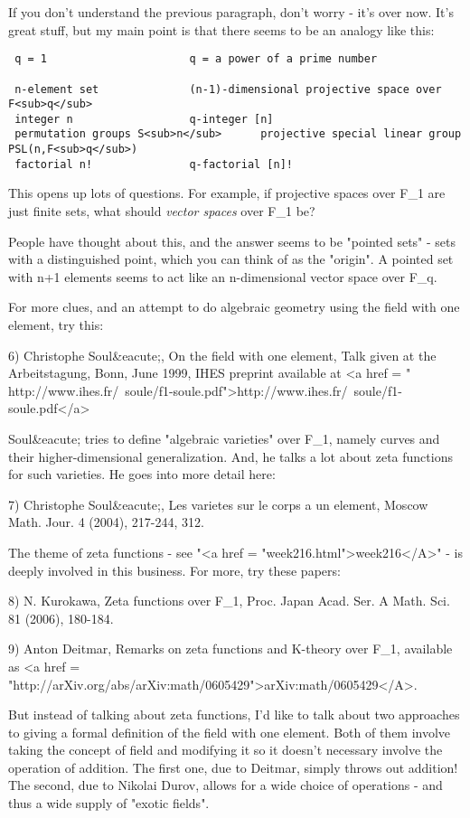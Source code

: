 If you don't understand the previous paragraph, don't worry - it's
over now.  It's great stuff, but my main point is that there seems to 
be an analogy like this:

\begin{verbatim}
 q = 1                      q = a power of a prime number    

 n-element set              (n-1)-dimensional projective space over F<sub>q</sub>
 integer n                  q-integer [n]
 permutation groups S<sub>n</sub>      projective special linear group PSL(n,F<sub>q</sub>)
 factorial n!               q-factorial [n]!
\end{verbatim}
    

This opens up lots of questions.  For example, if projective spaces over
F_{1} are just finite sets, what should \emph{vector spaces} 
over F_{1} be?  

People have thought about this, and the answer seems to be
"pointed sets" - sets with a distinguished point, which you
can think of as the "origin".  A pointed set with n+1
elements seems to act like an n-dimensional vector space over
F_{q}.

For more clues, and an attempt to do algebraic geometry using the 
field with one element, try this:

6) Christophe Soul&eacute;, On the field with one element, Talk given at the 
Arbeitstagung, Bonn, June 1999, IHES preprint available at
<a href = " http://www.ihes.fr/~soule/f1-soule.pdf">http://www.ihes.fr/~soule/f1-soule.pdf</a>

Soul&eacute; tries to define "algebraic varieties" over
F_{1}, namely curves and their higher-dimensional
generalization.  And, he talks a lot about zeta functions for such
varieties.  He goes into more detail here:

7) Christophe Soul&eacute;, Les varietes sur le corps a un element, Moscow
Math. Jour. 4 (2004), 217-244, 312.

The theme of zeta functions - see "<a href =
"week216.html">week216</A>" - is deeply involved in this
business.  For more, try these papers:

8) N. Kurokawa, Zeta functions over F_{1}, Proc. Japan Acad. Ser. A
Math. Sci. 81 (2006), 180-184.

9) Anton Deitmar, Remarks on zeta functions and K-theory over F_{1},
available as <a href =
"http://arXiv.org/abs/arXiv:math/0605429">arXiv:math/0605429</A>.
 
But instead of talking about zeta functions, I'd like to talk about
two approaches to giving a formal definition of the field with one
element.  Both of them involve taking the concept of field and 
modifying it so it doesn't necessary involve the operation of addition.
The first one, due to Deitmar, simply throws out addition!  The second,
due to Nikolai Durov, allows for a wide choice of operations - and thus
a wide supply of "exotic fields".

